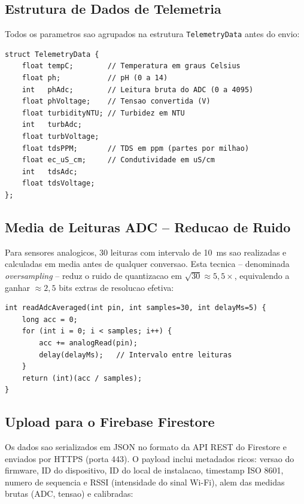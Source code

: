 \documentclass[12pt, a4paper]{article}
\begin{document}
\subsection{Estrutura de Dados de Telemetria}

Todos os parametros sao agrupados na estrutura \texttt{TelemetryData} antes do envio:

\begin{lstlisting}[language=ArduinoC, caption={Estrutura de dados de telemetria (firmware.ino, linha 65).}]
struct TelemetryData {
    float tempC;        // Temperatura em graus Celsius
    float ph;           // pH (0 a 14)
    int   phAdc;        // Leitura bruta do ADC (0 a 4095)
    float phVoltage;    // Tensao convertida (V)
    float turbidityNTU; // Turbidez em NTU
    int   turbAdc;
    float turbVoltage;
    float tdsPPM;       // TDS em ppm (partes por milhao)
    float ec_uS_cm;     // Condutividade em uS/cm
    int   tdsAdc;
    float tdsVoltage;
};
\end{lstlisting}

\subsection{Media de Leituras ADC -- Reducao de Ruido}

Para sensores analogicos, 30 leituras com intervalo de 10~ms sao realizadas e calculadas em
media antes de qualquer conversao. Esta tecnica -- denominada \textit{oversampling} -- reduz
o ruido de quantizacao em $\sqrt{30} \approx 5{,}5\times$, equivalendo a ganhar $\approx 2{,}5$ bits
extras de resolucao efetiva:

\begin{lstlisting}[language=ArduinoC, caption={Media de N leituras ADC para reducao de ruido (firmware.ino, linha 113).}]
int readAdcAveraged(int pin, int samples=30, int delayMs=5) {
    long acc = 0;
    for (int i = 0; i < samples; i++) {
        acc += analogRead(pin);
        delay(delayMs);   // Intervalo entre leituras
    }
    return (int)(acc / samples);
}
\end{lstlisting}

\subsection{Upload para o Firebase Firestore}

Os dados sao serializados em JSON no formato da API REST do Firestore e enviados por HTTPS
(porta 443). O payload inclui metadados ricos: versao do firmware, ID do dispositivo, ID
do local de instalacao, timestamp ISO 8601, numero de sequencia e RSSI (intensidade do sinal
Wi-Fi), alem das medidas brutas (ADC, tensao) e calibradas:
\end{document}

